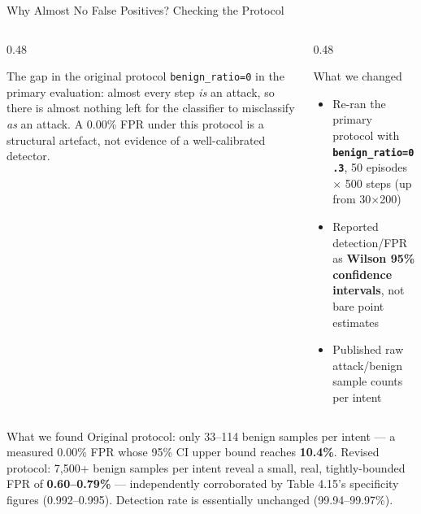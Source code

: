 \documentclass[aspectratio=169, 12pt]{beamer}
\begin{document}
\begin{frame}{Why Almost No False Positives? Checking the Protocol}
  \begin{columns}[T]
    \begin{column}{0.48\textwidth}
      \begin{alertblock}{The gap in the original protocol}
        \texttt{benign\_ratio=0} in the primary evaluation: almost every
        step \emph{is} an attack, so there is almost nothing left for
        the classifier to misclassify \emph{as} an attack. A 0.00\% FPR
        under this protocol is a structural artefact, not evidence of a
        well-calibrated detector.
      \end{alertblock}
    \end{column}
    \begin{column}{0.48\textwidth}
      \begin{exampleblock}{What we changed}
        \begin{itemize}
          \item Re-ran the primary protocol with
                \textbf{\texttt{benign\_ratio=0.3}}, 50 episodes $\times$
                500 steps (up from 30$\times$200)
          \item Reported detection/FPR as \textbf{Wilson 95\% confidence
                intervals}, not bare point estimates
          \item Published raw attack/benign sample counts per intent
        \end{itemize}
      \end{exampleblock}
    \end{column}
  \end{columns}
  \vspace{0.4cm}
  \begin{block}{What we found}
    Original protocol: only 33--114 benign samples per intent --- a
    measured 0.00\% FPR whose 95\% CI upper bound reaches
    \textbf{10.4\%}. Revised protocol: 7{,}500+ benign samples per
    intent reveal a small, real, tightly-bounded FPR of
    \textbf{0.60--0.79\%} --- independently corroborated by Table 4.15's
    specificity figures (0.992--0.995). Detection rate is essentially
    unchanged (99.94--99.97\%).
  \end{block}
\end{frame}
\end{document}
